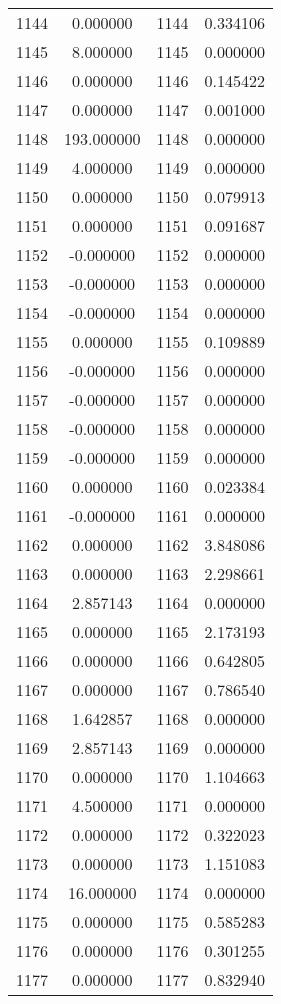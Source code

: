 \documentclass[12pt]{article}
\begin{document}
\begin{longtable}{@{}cccc@{}}
1144 & 0.000000 & 1144 & 0.334106 \\
1145 & 8.000000 & 1145 & 0.000000 \\
1146 & 0.000000 & 1146 & 0.145422 \\
1147 & 0.000000 & 1147 & 0.001000 \\
1148 & 193.000000 & 1148 & 0.000000 \\
1149 & 4.000000 & 1149 & 0.000000 \\
1150 & 0.000000 & 1150 & 0.079913 \\
1151 & 0.000000 & 1151 & 0.091687 \\
1152 & -0.000000 & 1152 & 0.000000 \\
1153 & -0.000000 & 1153 & 0.000000 \\
1154 & -0.000000 & 1154 & 0.000000 \\
1155 & 0.000000 & 1155 & 0.109889 \\
1156 & -0.000000 & 1156 & 0.000000 \\
1157 & -0.000000 & 1157 & 0.000000 \\
1158 & -0.000000 & 1158 & 0.000000 \\
1159 & -0.000000 & 1159 & 0.000000 \\
1160 & 0.000000 & 1160 & 0.023384 \\
1161 & -0.000000 & 1161 & 0.000000 \\
1162 & 0.000000 & 1162 & 3.848086 \\
1163 & 0.000000 & 1163 & 2.298661 \\
1164 & 2.857143 & 1164 & 0.000000 \\
1165 & 0.000000 & 1165 & 2.173193 \\
1166 & 0.000000 & 1166 & 0.642805 \\
1167 & 0.000000 & 1167 & 0.786540 \\
1168 & 1.642857 & 1168 & 0.000000 \\
1169 & 2.857143 & 1169 & 0.000000 \\
1170 & 0.000000 & 1170 & 1.104663 \\
1171 & 4.500000 & 1171 & 0.000000 \\
1172 & 0.000000 & 1172 & 0.322023 \\
1173 & 0.000000 & 1173 & 1.151083 \\
1174 & 16.000000 & 1174 & 0.000000 \\
1175 & 0.000000 & 1175 & 0.585283 \\
1176 & 0.000000 & 1176 & 0.301255 \\
1177 & 0.000000 & 1177 & 0.832940 \\

\end{longtable}
\end{document}
